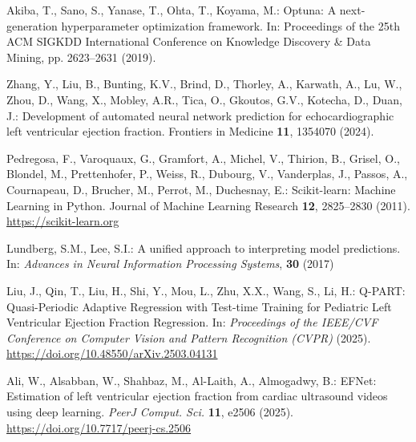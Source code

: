 \documentclass[runningheads]{llncs}
\begin{document}
\begin{thebibliography}{99}
Akiba, T., Sano, S., Yanase, T., Ohta, T., Koyama, M.: Optuna: A next-generation hyperparameter optimization framework. In: Proceedings of the 25th ACM SIGKDD International Conference on Knowledge Discovery \& Data Mining, pp. 2623--2631 (2019). 

Zhang, Y., Liu, B., Bunting, K.V., Brind, D., Thorley, A., Karwath, A., Lu, W., Zhou, D., Wang, X., Mobley, A.R., Tica, O., Gkoutos, G.V., Kotecha, D., Duan, J.: Development of automated neural network prediction for echocardiographic left ventricular ejection fraction. Frontiers in Medicine \textbf{11}, 1354070 (2024). 

Pedregosa, F., Varoquaux, G., Gramfort, A., Michel, V., Thirion, B., Grisel, O., Blondel, M., Prettenhofer, P., Weiss, R., Dubourg, V., Vanderplas, J., Passos, A., Cournapeau, D., Brucher, M., Perrot, M., Duchesnay, E.: Scikit-learn: Machine Learning in Python. Journal of Machine Learning Research \textbf{12}, 2825--2830 (2011). \url{https://scikit-learn.org}

Lundberg, S.M., Lee, S.I.: A unified approach to interpreting model predictions. In: \textit{Advances in Neural Information Processing Systems}, \textbf{30} (2017)

Liu, J., Qin, T., Liu, H., Shi, Y., Mou, L., Zhu, X.X., Wang, S., Li, H.: Q-PART: Quasi-Periodic Adaptive Regression with Test-time Training for Pediatric Left Ventricular Ejection Fraction Regression. In: \textit{Proceedings of the IEEE/CVF Conference on Computer Vision and Pattern Recognition (CVPR)} (2025). \url{https://doi.org/10.48550/arXiv.2503.04131}

Ali, W., Alsabban, W., Shahbaz, M., Al-Laith, A., Almogadwy, B.: EFNet: Estimation of left ventricular ejection fraction from cardiac ultrasound videos using deep learning. \textit{PeerJ Comput. Sci.} \textbf{11}, e2506 (2025). \url{https://doi.org/10.7717/peerj-cs.2506}

\end{thebibliography}
\end{document}

